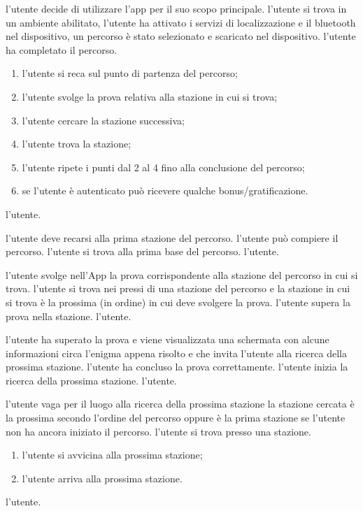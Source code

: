 
\desc l'utente decide di utilizzare l'app per il suo scopo principale.
\pre l'utente si trova in un ambiente abilitato, l'utente ha attivato i servizi di localizzazione e il bluetooth nel dispositivo, un percorso è stato selezionato e scaricato nel dispositivo.
\post l'utente ha completato il percorso.
\scen
  \begin{enumerate}
    \item \textbf{} l'utente si reca sul punto di partenza del percorso;
    \item \textbf{} l'utente svolge la prova relativa alla stazione in cui si trova;
    \item \textbf{} l'utente cercare la stazione successiva;
    \item \textbf{} l'utente trova la stazione;
    \item l'utente ripete i punti dal 2 al 4 fino alla conclusione del percorso;
    \item \textbf{} se l'utente è autenticato può ricevere qualche bonus/gratificazione.
  \end{enumerate}
\att l'utente.

\desc l'utente deve recarsi alla prima stazione del percorso.
\pre l'utente può compiere il percorso.
\post l'utente si trova alla prima base del percorso.
\att l'utente.

\desc l'utente svolge nell'App la prova corrispondente alla stazione del percorso in cui si trova.
\pre l'utente si trova nei pressi di una stazione del percorso e la stazione in cui si trova è la prossima (in ordine) in cui deve svolgere la prova.
\post l'utente supera la prova nella stazione.
\att l'utente.

\desc l'utente ha superato la prova e viene visualizzata una schermata con alcune informazioni circa l'enigma appena risolto e che invita l'utente alla ricerca della prossima stazione.
\pre l'utente ha concluso la prova correttamente.
\post l'utente inizia la ricerca della prossima stazione.
\att l'utente.

\desc l'utente vaga per il luogo alla ricerca della prossima stazione
\pre la stazione cercata è la prossima secondo l'ordine del percorso oppure è la prima stazione se l'utente non ha ancora iniziato il percorso.
\post l'utente si trova presso una stazione.
\scen
\begin{enumerate}
  \item \textbf{} l'utente si avvicina alla prossima stazione;
  \item \textbf{} l'utente arriva alla prossima stazione.
\end{enumerate}
\att l'utente.

